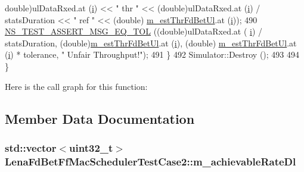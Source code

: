 \begin{DoxyCode}
      double)ulDataRxed.at (\hyperlink{bernuolliDistribution_8m_a6f6ccfcf58b31cb6412107d9d5281426}{i}) << \textcolor{stringliteral}{"  thr "} << (double)ulDataRxed.at (\hyperlink{bernuolliDistribution_8m_a6f6ccfcf58b31cb6412107d9d5281426}{i}) / statsDuration << \textcolor{stringliteral}{" ref "} << (double)
      \hyperlink{classLenaFdBetFfMacSchedulerTestCase2_ab64def4901dc0192ce44e970cd69b9a0}{m\_estThrFdBetUl}.at (\hyperlink{bernuolliDistribution_8m_a6f6ccfcf58b31cb6412107d9d5281426}{i}));
490       \hyperlink{group__testing_ga9e7861b56b4e70db3b56044cb7a28e41}{NS\_TEST\_ASSERT\_MSG\_EQ\_TOL} ((\textcolor{keywordtype}{double})ulDataRxed.at (
      \hyperlink{bernuolliDistribution_8m_a6f6ccfcf58b31cb6412107d9d5281426}{i}) / statsDuration, (double)\hyperlink{classLenaFdBetFfMacSchedulerTestCase2_ab64def4901dc0192ce44e970cd69b9a0}{m\_estThrFdBetUl}.at (\hyperlink{bernuolliDistribution_8m_a6f6ccfcf58b31cb6412107d9d5281426}{i}), (double)
      \hyperlink{classLenaFdBetFfMacSchedulerTestCase2_ab64def4901dc0192ce44e970cd69b9a0}{m\_estThrFdBetUl}.at (\hyperlink{bernuolliDistribution_8m_a6f6ccfcf58b31cb6412107d9d5281426}{i}) * tolerance, \textcolor{stringliteral}{" Unfair Throughput!"});
491     \}
492   Simulator::Destroy ();
493 
494 \}
\end{DoxyCode}


Here is the call graph for this function\+:




\subsection{Member Data Documentation}
\subsubsection[{\texorpdfstring{m\+\_\+achievable\+Rate\+Dl}{m_achievableRateDl}}]{\setlength{\rightskip}{0pt plus 5cm}std\+::vector$<$uint32\+\_\+t$>$ Lena\+Fd\+Bet\+Ff\+Mac\+Scheduler\+Test\+Case2\+::m\+\_\+achievable\+Rate\+Dl\hspace{0.3cm}{\ttfamily [private]}}\hypertarget{classLenaFdBetFfMacSchedulerTestCase2_aad2ad5fc6fa5eb0beb33a5ae45269c53}{}\label{classLenaFdBetFfMacSchedulerTestCase2_aad2ad5fc6fa5eb0beb33a5ae45269c53}
